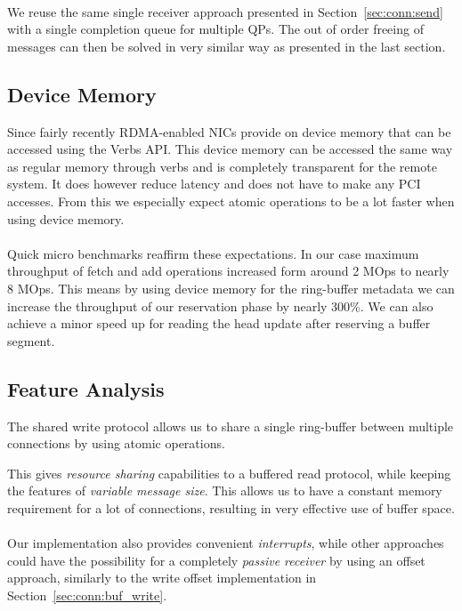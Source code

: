 \paragraph{} We reuse the same single receiver approach presented in Section~\ref{sec:conn:send} with a single completion queue for multiple
QPs. The out of order freeing of messages can then be solved in very similar way as presented in the last section.


\subsection{Device Memory}
Since fairly recently RDMA-enabled NICs provide on device memory that can be accessed using the Verbs API. This device memory can 
be accessed the same way as regular memory through verbs and is completely transparent for the remote system. It does however
reduce latency and does not have to make any PCI accesses. From this we especially expect atomic operations to be a lot faster
when using device memory.

\paragraph{} Quick micro benchmarks reaffirm these expectations. In our case maximum throughput of fetch and add operations 
increased form around 2 MOps to nearly 8 MOps. This means by using device memory for the ring-buffer metadata we can increase
the throughput of our reservation phase by nearly 300\%. We can also achieve a minor speed up for reading the head update after
reserving a buffer segment.


\subsection{Feature Analysis}

The shared write protocol allows us to share a single ring-buffer between multiple connections by using atomic operations.

This gives \emph{resource sharing} capabilities to a buffered read protocol, while keeping the features of 
\emph{variable message size}. This allows us to have a constant memory requirement for a lot of connections,
resulting in very effective use of buffer space.


\paragraph{} Our implementation also provides convenient \emph{interrupts}, while other approaches could have the possibility 
for a completely \emph{passive receiver} by using an offset approach, similarly to the write offset implementation in 
Section~\ref{sec:conn:buf_write}.


